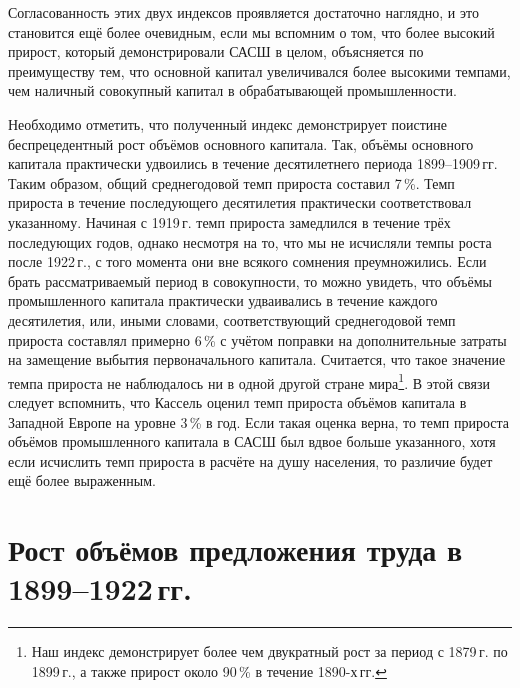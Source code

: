 \documentclass[leqno]{article}  %
\begin{document}
\par
Согласованность этих двух индексов проявляется достаточно наглядно, и это становится ещё более очевидным, если мы вспомним о том, что более высокий прирост, который демонстрировали САСШ в целом, объясняется по преимуществу тем, что основной капитал увеличивался более высокими темпами, чем наличный совокупный капитал в обрабатывающей промышленности.
\par
Необходимо отметить, что полученный индекс демонстрирует поистине беспрецедентный рост объёмов основного капитала. Так, объёмы основного капитала практически удвоились в течение десятилетнего периода 1899--1909\,гг. Таким образом, общий среднегодовой темп прироста составил 7\,\%. Темп прироста в течение последующего десятилетия практически соответствовал указанному. Начиная с 1919\,г. темп прироста замедлился в течение трёх последующих годов, однако несмотря на то, что мы не исчисляли темпы роста после 1922\,г., с того момента они вне всякого сомнения преумножились. Если брать рассматриваемый период в совокупности, то можно увидеть, что объёмы промышленного капитала практически удваивались в течение каждого десятилетия, или, иными словами, соответствующий среднегодовой темп прироста составлял примерно 6\,\% с учётом поправки на дополнительные затраты на замещение выбытия первоначального капитала. Считается, что такое значение темпа прироста не наблюдалось ни в одной другой стране мира\footnote{Наш индекс демонстрирует более чем двукратный рост за период с 1879\,г. по 1899\,г., а также прирост около 90\,\% в течение 1890-х\,гг.}. В этой связи следует вспомнить, что Кассель оценил темп прироста объёмов капитала в Западной Европе на уровне 3\,\% в год. Если такая оценка верна, то темп прироста объёмов промышленного капитала в САСШ был вдвое больше указанного, хотя если исчислить темп прироста в расчёте на душу населения, то различие будет ещё более выраженным.

\section{Рост объёмов предложения труда в \\ 1899--1922\,гг.}
\end{document}
